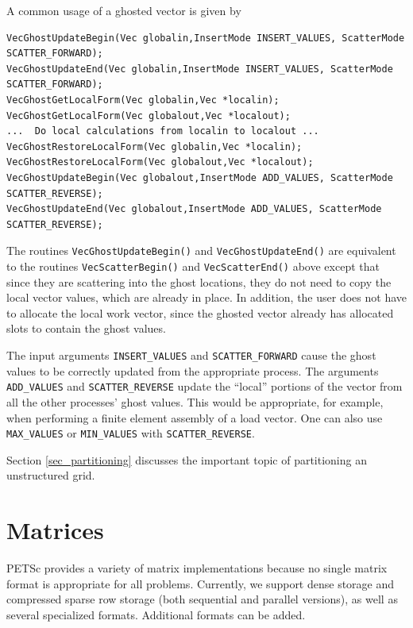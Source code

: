 A common usage of a ghosted vector is given by
\begin{lstlisting}
VecGhostUpdateBegin(Vec globalin,InsertMode INSERT_VALUES, ScatterMode SCATTER_FORWARD);
VecGhostUpdateEnd(Vec globalin,InsertMode INSERT_VALUES, ScatterMode SCATTER_FORWARD);
VecGhostGetLocalForm(Vec globalin,Vec *localin);
VecGhostGetLocalForm(Vec globalout,Vec *localout);
...  Do local calculations from localin to localout ...
VecGhostRestoreLocalForm(Vec globalin,Vec *localin);
VecGhostRestoreLocalForm(Vec globalout,Vec *localout);
VecGhostUpdateBegin(Vec globalout,InsertMode ADD_VALUES, ScatterMode SCATTER_REVERSE);
VecGhostUpdateEnd(Vec globalout,InsertMode ADD_VALUES, ScatterMode SCATTER_REVERSE);
\end{lstlisting}

The routines \lstinline{VecGhostUpdateBegin()} and \lstinline{VecGhostUpdateEnd()} are equivalent to the routines \lstinline{VecScatterBegin()} and \lstinline{VecScatterEnd()}
above except that since they are scattering into the ghost locations, they do not need
to copy the local vector values, which are already in place. In addition, the user does not
have to allocate the local work vector, since the ghosted vector already has allocated
slots to contain the ghost values.

The input arguments \lstinline{INSERT_VALUES} and \lstinline{SCATTER_FORWARD}
cause the ghost values to be correctly updated from the appropriate
process. The arguments \lstinline{ADD_VALUES} and \lstinline{SCATTER_REVERSE}
update the ``local'' portions of the vector from all the other
processes' ghost values.  This would be appropriate, for example,
when performing a finite element assembly of a load vector.
One can also use \lstinline{MAX_VALUES} or \lstinline{MIN_VALUES} with \lstinline{SCATTER_REVERSE}.

Section \ref{sec_partitioning} discusses the important topic of partitioning
an unstructured grid.

\cleardoublepage
\chapter{Matrices}
\label{chapter_matrices}

PETSc provides a variety of matrix implementations because no
single matrix format is appropriate for all problems.  Currently, we
support dense storage and compressed sparse row storage (both
sequential and parallel versions), as well as several specialized
formats.  Additional formats can be added.


